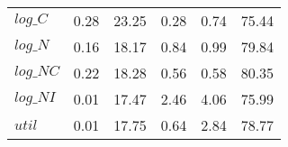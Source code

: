 \begin{center}
\begin{longtable}{lccccc}
$log\_C          $	 & 	        0.28	 & 	       23.25	 & 	        0.28	 & 	        0.74	 & 	       75.44 \\ 
$log\_N          $	 & 	        0.16	 & 	       18.17	 & 	        0.84	 & 	        0.99	 & 	       79.84 \\ 
$log\_NC         $	 & 	        0.22	 & 	       18.28	 & 	        0.56	 & 	        0.58	 & 	       80.35 \\ 
$log\_NI         $	 & 	        0.01	 & 	       17.47	 & 	        2.46	 & 	        4.06	 & 	       75.99 \\ 
${util}          $	 & 	        0.01	 & 	       17.75	 & 	        0.64	 & 	        2.84	 & 	       78.77 \\ 
\end{longtable}
 \end{center}
